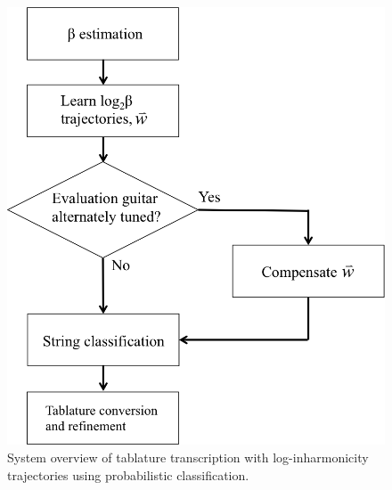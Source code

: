 \documentclass[12pt]{cmuthesis}
\begin{document}
\begin{figure}[!htbp] 
\centering
\includegraphics[scale=0.6]{overview}
\caption{System overview of tablature transcription with log-inharmonicity trajectories using probabilistic classification.}
\label{fig:overview}
\end{figure}
\end{document}
